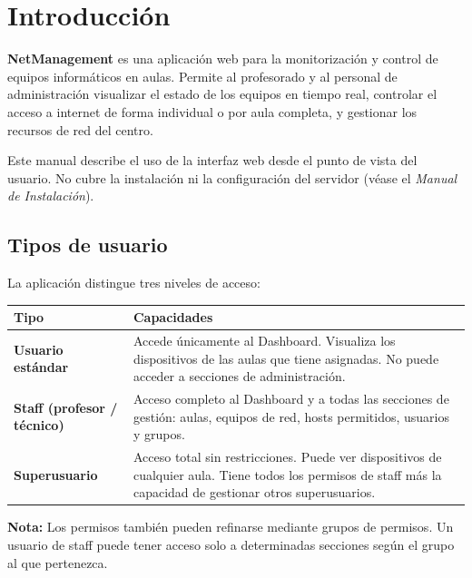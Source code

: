 \documentclass[12pt,a4paper]{article}
\begin{document}
\section{Introducción}

\textbf{NetManagement} es una aplicación web para la monitorización y control de equipos informáticos en aulas. Permite al profesorado y al personal de administración visualizar el estado de los equipos en tiempo real, controlar el acceso a internet de forma individual o por aula completa, y gestionar los recursos de red del centro.

Este manual describe el uso de la interfaz web desde el punto de vista del usuario. No cubre la instalación ni la configuración del servidor (véase el \textit{Manual de Instalación}).

\subsection{Tipos de usuario}

La aplicación distingue tres niveles de acceso:

\begin{table}[H]
\centering
\begin{tabularx}{\textwidth}{lX}
    \toprule
    \textbf{Tipo} & \textbf{Capacidades} \\
    \midrule
    \textbf{Usuario estándar} & Accede únicamente al Dashboard. Visualiza los dispositivos de las aulas que tiene asignadas. No puede acceder a secciones de administración. \\[0.3cm]
    \textbf{Staff (profesor / técnico)} & Acceso completo al Dashboard y a todas las secciones de gestión: aulas, equipos de red, hosts permitidos, usuarios y grupos. \\[0.3cm]
    \textbf{Superusuario} & Acceso total sin restricciones. Puede ver dispositivos de cualquier aula. Tiene todos los permisos de staff más la capacidad de gestionar otros superusuarios. \\
    \bottomrule
\end{tabularx}
\end{table}

\begin{infonote}
\textbf{Nota:} Los permisos también pueden refinarse mediante grupos de permisos. Un usuario de staff puede tener acceso solo a determinadas secciones según el grupo al que pertenezca.
\end{infonote}
\end{document}
